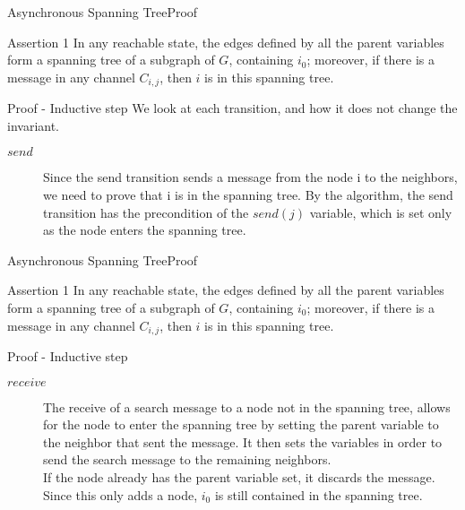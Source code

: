 \documentclass[pdf]{beamer}
\begin{document}
\begin{frame}[plain]{Asynchronous Spanning Tree}{Proof}
    \begin{block}{Assertion 1}
    In any reachable state, the edges defined by all the parent variables form a spanning tree
    of a subgraph of $G$, containing $i_0$; moreover, if there is a message in any channel $C_{i,j}$,
    then $i$ is in this spanning tree.
    \end{block}	
    \begin{block}{Proof - Inductive step}
    We look at each transition, and how it does not change the invariant.
    \begin{description}
    \item[$send$]{Since the send transition sends a message from the node i to the neighbors, we need
        to prove that i is in the spanning tree. By the algorithm, the send transition has the precondition of the $send(j)$ variable, which is set only as the node enters the spanning tree.}
    \end{description}
    \end{block}
\end{frame}

\begin{frame}[plain]{Asynchronous Spanning Tree}{Proof}
    \begin{block}{Assertion 1}
    In any reachable state, the edges defined by all the parent variables form a spanning tree
    of a subgraph of $G$, containing $i_0$; moreover, if there is a message in any channel $C_{i,j}$,
    then $i$ is in this spanning tree.
    \end{block}	
    \begin{block}{Proof - Inductive step}
    \begin{description}
    \item[$receive$]{\small The receive of a search message to a node not in the spanning tree, allows for the node to enter the spanning tree by setting the parent variable to the neighbor that sent the message. It then sets the variables in order to send the search message to the remaining neighbors.\\
        If the node already has the parent variable set, it discards the message. 
    Since this only adds a node, $i_0$ is still contained in the spanning tree.}
    \end{description}
    \end{block}
\end{frame}
\end{document}
